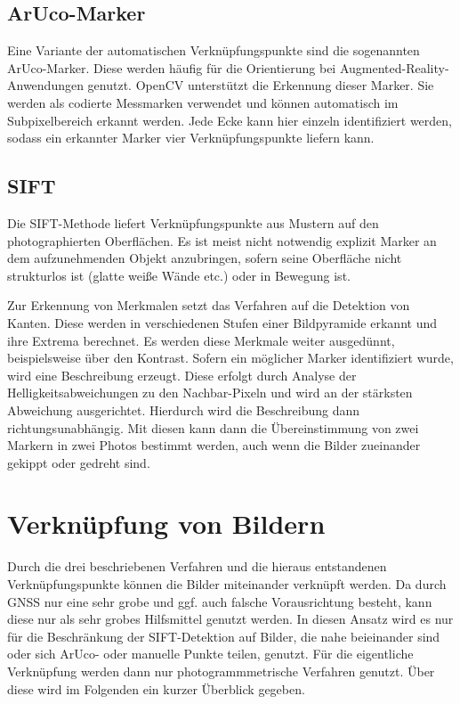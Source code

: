 \documentclass[./00PhotoBox.tex]{subfiles}
\begin{document}
\subsection{ArUco-Marker}
Eine Variante der automatischen Verknüpfungspunkte sind die sogenannten ArUco-Marker. Diese werden häufig für die Orientierung bei Augmented-Reality-Anwend\-ungen genutzt. OpenCV unterstützt die Erkennung dieser Marker. Sie werden als codierte Messmarken verwendet und können automatisch im Subpixelbereich erkannt werden. Jede Ecke kann hier einzeln identifiziert werden, sodass ein erkannter Marker vier Verknüpfungspunkte liefern kann.

\subsection{SIFT}
Die SIFT-Methode liefert Verknüpfungspunkte aus Mustern auf den photographierten Oberflächen. Es ist meist nicht notwendig explizit Marker an dem aufzunehmenden Objekt anzubringen, sofern seine Oberfläche nicht strukturlos ist (glatte weiße Wände etc.) oder in Bewegung ist.

Zur Erkennung von Merkmalen setzt das Verfahren auf die Detektion von Kanten. Diese werden in verschiedenen Stufen einer Bildpyramide erkannt und ihre Extrema berechnet. Es werden diese Merkmale weiter ausgedünnt, beispielsweise über den Kontrast. Sofern ein möglicher Marker identifiziert wurde, wird eine Beschreibung erzeugt. Diese erfolgt  durch Analyse der Helligkeitsabweichungen zu den Nachbar-Pixeln und wird an der stärksten Abweichung ausgerichtet. Hierdurch wird die Beschreibung dann richtungsunabhängig. Mit diesen kann dann die Übereinstimmung von zwei Markern in zwei Photos bestimmt werden, auch wenn die Bilder zueinander gekippt oder gedreht sind.
\citep[S. 483]{luhmann4}

\section{Verknüpfung von Bildern}
\label{s:photogramm}
Durch die drei beschriebenen Verfahren und die hieraus entstandenen Verknüpfungs\-punkte können die Bilder miteinander verknüpft werden. Da durch GNSS nur eine sehr grobe und ggf. auch falsche Vorausrichtung besteht, kann diese nur als sehr grobes Hilfsmittel genutzt werden. In diesen Ansatz wird es nur für die Beschränkung der SIFT-Detektion auf Bilder, die nahe beieinander sind oder sich ArUco- oder manuelle Punkte teilen, genutzt.
Für die eigentliche Verknüpfung werden dann nur photogrammmetrische Verfahren genutzt. Über diese wird im Folgenden ein kurzer Überblick gegeben.
\end{document}
